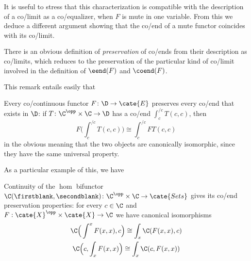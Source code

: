 It is useful to stress that this characterization is compatible with the description of a co/limit as a co/equalizer, when $F$ is mute in one variable. From this we deduce a different argument showing that the co/end of a mute functor coincides with its co/limit.
\begin{definition}
There is an obvious definition of \emph{preservation} of co/ends from their description as co/limits, which reduces to the preservation of the particular kind of co/limit involved in the definition of $\eend(F)$ and $\coend(F)$.
\end{definition}
This remark entails easily that 
\begin{theorem}\label{coconti}
Every co/continuous functor $F\colon \D\to\cate{E}$ preserves every co/end that exists in $\D$: if $T\colon \C^\opp\times\C\to \D$ has a co/end $\int_c^{/c} T(c,c)$, then 
\[
F\Big(\textstyle \int_c^{/c} T(c,c) \Big) \cong \int_c^{/c} FT(c,c)
\]
in the obvious meaning that the two objects are canonically isomorphic, since they have the same universal property.
\end{theorem}
As a particular example of this, we have
\begin{corollary}\label{commuhom}
Continuity of the $\hom$ bifunctor $\C(\firstblank,\secondblank)\colon \C^\opp\times\C\to\cate{Sets}$ gives its co/end preservation properties: for every $c\in \C$ and $F : \cate{X}^\opp\times\cate{X}\to \C$ we have canonical isomorphisms
\begin{gather*}
\C\Big( \int^x F(x,x),c \Big)  \cong \int_x \C(F(x,x),c)\\
\C\Big(c, \int_x F(x,x)\Big)\cong \int_x\C(c,F(x,x))
\end{gather*}
\end{corollary}
